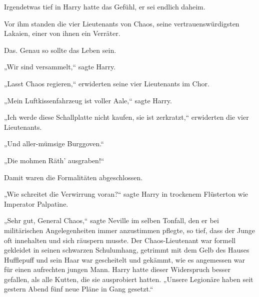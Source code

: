 Irgendetwas tief in Harry hatte das Gefühl, er sei endlich daheim.

Vor ihm standen die vier Lieutenants von Chaos, seine vertrauenswürdigsten Lakaien, einer von ihnen ein Verräter.

Das. Genau so sollte das Leben sein.

„Wir sind versammelt,“ sagte Harry.

„Lasst Chaos regieren,“ erwiderten seine vier Lieutenants im Chor.

„Mein Luftkissenfahrzeug ist voller Aale,“ sagte Harry.

„Ich werde diese Schallplatte nicht kaufen, sie ist zerkratzt,“ erwiderten die vier Lieutenants.

„Und aller-mümsige Burggoven.“

„Die mohmen Räth' ausgraben!“

Damit waren die Formalitäten abgeschlossen.

„Wie schreitet die Verwirrung voran?“ sagte Harry in trockenem Flüsterton wie Imperator Palpatine.

„Sehr gut, General Chaos,“ sagte Neville im selben Tonfall, den er bei militärischen Angelegenheiten immer anzustimmen pflegte, so tief, dass der Junge oft innehalten und sich räuspern musste. Der Chaos-Lieutenant war formell gekleidet in seinen schwarzen Schulumhang, getrimmt mit dem Gelb des Hauses Hufflepuff und sein Haar war gescheitelt und gekämmt, wie es angemessen war für einen aufrechten jungen Mann. Harry hatte dieser Widerspruch besser gefallen, als alle Kutten, die sie ausprobiert hatten. „Unsere Legionäre haben seit gestern Abend fünf neue Pläne in Gang gesetzt.“

